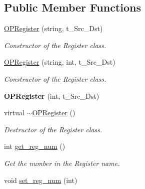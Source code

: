 \subsection*{Public Member Functions}
\begin{DoxyCompactItemize}
\item 
\mbox{\label{class_o_p_register_a896eb65f36bf615ccfa74541de23858f}} 
\mbox{\hyperlink{class_o_p_register_a896eb65f36bf615ccfa74541de23858f}{O\+P\+Register}} (string, t\+\_\+\+Src\+\_\+\+Dst)
\begin{DoxyCompactList}\small\item\em Constructor of the Register class. \end{DoxyCompactList}\item 
\mbox{\label{class_o_p_register_ad75c23d1db7c149c20cbc8bb01c6df59}} 
\mbox{\hyperlink{class_o_p_register_ad75c23d1db7c149c20cbc8bb01c6df59}{O\+P\+Register}} (string, int, t\+\_\+\+Src\+\_\+\+Dst)
\begin{DoxyCompactList}\small\item\em Constructor of the Register class. \end{DoxyCompactList}\item 
\mbox{\label{class_o_p_register_a3c9786680764ada47370d469790b8178}} 
{\bfseries O\+P\+Register} (int, t\+\_\+\+Src\+\_\+\+Dst)
\item 
\mbox{\label{class_o_p_register_aedab3bc5a2eecd0d02771fb6b37d73fe}} 
virtual \mbox{\hyperlink{class_o_p_register_aedab3bc5a2eecd0d02771fb6b37d73fe}{$\sim$\+O\+P\+Register}} ()
\begin{DoxyCompactList}\small\item\em Destructor of the Register class. \end{DoxyCompactList}\item 
int \mbox{\hyperlink{class_o_p_register_acd1c47e67de36adf6b1b88c0a4760b7e}{get\+\_\+reg\+\_\+num}} ()
\begin{DoxyCompactList}\small\item\em Get the number in the Register name. \end{DoxyCompactList}\item 
\mbox{\label{class_o_p_register_a1465b14515c02816c15dd1e2b244a4f2}} 
void \mbox{\hyperlink{class_o_p_register_a1465b14515c02816c15dd1e2b244a4f2}{set\+\_\+reg\+\_\+num}} (int)

\end{DoxyCompactItemize}
